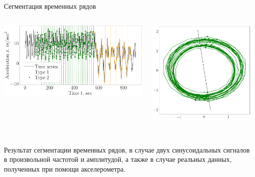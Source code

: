 \documentclass[10pt,pdf,hyperref={unicode}]{beamer}
\begin{document}
\begin{frame}[shrink=5]{Сегментация временных рядов}
\begin{columns}
    \begin{column}{0.5\textwidth}
        \includegraphics[width=1\textwidth]{results/real_2_segmentation_vector}
    \end{column}
    \begin{column}{0.3\textwidth}
        \includegraphics[width=1\textwidth]{results/real_2_phase_space1}
    \end{column}
\end{columns}

~\\
Результат сегментации временных рядов, в случае двух синусоидальных сигналов в произвольной частотой и амплитудой, а также в случае реальных данных, полученных при помощи акселерометра.

\end{frame}
\end{document}
